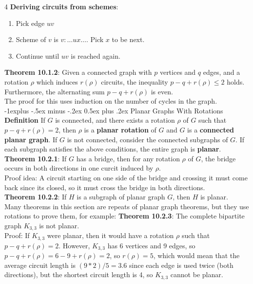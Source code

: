 \documentclass[letterpaper, 8pt]{extarticle}
\makeatletter
\renewcommand{\section}{\@startsection{section}{1}{0mm}%
	{-1explus -.5ex minus -.2ex}%
	{0.5ex plus .2ex}%
	{\normalfont\normalsize\bfseries}}
\makeatother
\begin{document}
\begin{multicols*}{4}
	\textbf{Deriving circuits from schemes}:
	\begin{enumerate}
		\item Pick edge $uv$
		\item Scheme of $v$ is $v: \dots ux \dots$. Pick $x$ to be next.
		\item Continue until $uv$ is reached again.
	\end{enumerate}
	\textbf{Theorem 10.1.2}: Given a connected graph with $p$ vertices and $q$ edges, and a rotation $\rho$ which induces $r(\rho)$ circuits, the inequality $p-q+r(\rho) \leq 2$ holds. Furthermore, the alternating sum $p-q+r(\rho)$ is even. \\
	The proof for this uses induction on the number of cycles in the graph. \\
	\section{Planar Graphs With Rotations}
	\textbf{Definition} If $G$ is connected, and there exists a rotation $\rho$ of $G$ such that $p-q+r(\rho) = 2$, then $\rho$ is a \textbf{planar rotation} of $G$ and $G$ is a \textbf{connected planar graph}. If $G$ is not connected, consider the connected subgraphs of $G$. If each subgraph satisfies the above conditions, the entire graph is \textbf{planar}. \\
	\textbf{Theorem 10.2.1}: If $G$ has a bridge, then for any rotation $\rho$ of $G$, the bridge occurs in both directions in one curcit induced by $\rho$. \\
	Proof idea: A circuit starting on one side of the bridge and crossing it must come back since its closed, so it must cross the bridge in both directions. \\
	\textbf{Theorem 10.2.2}: If $H$ is a subgraph of planar graph $G$, then $H$ is planar. \\
	Many theorems in this section are repeats of planar graph theorems, but they use rotations to prove them, for example:
	\textbf{Theorem 10.2.3}: The complete bipartite graph $K_{3,3}$ is not planar. \\
	Proof: If $K_{3,3}$ were planar, then it would have a rotation $\rho$ such that $p-q+r(\rho) = 2$. However, $K_{3,3}$ has 6 vertices and 9 edges, so $p-q+r(\rho) = 6-9+r(\rho) = 2$, so $r(\rho) = 5$, which would mean that the average circuit length is $(9*2)/5 = 3.6$ since each edge is used twice (both directions), but the shortest circuit length is 4, so $K_{3,3}$ cannot be planar. \\

\end{multicols*}
\end{document}
